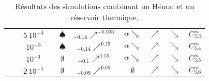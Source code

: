 \begin{table}[htbp]
\begin{tabular}{|c|c|c|c|c|c|c|c|c|c|}
					& & $5\ 10^{-4}$ & \accretionlot{} & $\spadesuit$ & ${}_{-0.14}\nearrow^{-0.003}$ & $\alpha\searrow$ & $\nearrow$ & $\searrow$ & $C_{3.3}^m$  \tabularnewline \cline{3-10}
					& & $10^{-3}$ & \accretionlot{} & $\spadesuit$ & ${}_{-0.14}\nearrow^{0.15}$ & $\alpha\searrow$ & $\nearrow$ & $\searrow$ & $C_{3.4}^m$  \tabularnewline \cline{3-10}
					& & $10^{-1}$ & \accretionlot{} & $\emptyset$ & ${}_{-0.1}\nearrow^{0.15}$ & $\alpha\searrow$ & $\nearrow$ & $\searrow$ & $C_{3.5}^m$  \tabularnewline \cline{3-10}
					& & $2\ 10^{-1}$ & \accretionlot{} & $\emptyset$ & ${}_{-0.09}\nearrow^{0.09}$ & $\emptyset$ & $\nearrow$ & $\searrow$ & $C_{3.6}^m$  \tabularnewline \cline{2-10}
			\hline
		\end{tabular}
	\caption{Résultats des simulations combinant un Hénon et un réservoir thermique.\label{Tab::SimuZoomRes}}
\end{table}


